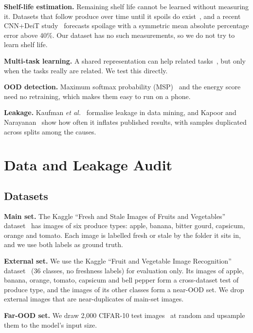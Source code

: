 \documentclass[conference]{IEEEtran}
\begin{document}
\textbf{Shelf-life estimation.} Remaining shelf life cannot be learned without
measuring it. Datasets that follow produce over time until it spoils do
exist~\cite{fruqdb2022}, and a recent CNN+DeiT study~\cite{shelflife2026arxiv}
forecasts spoilage with a symmetric mean absolute percentage error above 40\%.
Our dataset has no such measurements, so we do not try to learn shelf life.

\textbf{Multi-task learning.} A shared representation can help related
tasks~\cite{caruana1997multitask,ruder2017overview}, but only when the tasks
really are related. We test this directly.

\textbf{OOD detection.} Maximum softmax probability (MSP)~\cite{hendrycks2017baseline}
and the energy score~\cite{liu2020energy} need no retraining, which makes them
easy to run on a phone.

\textbf{Leakage.} Kaufman \emph{et al.}~\cite{kaufman2012leakage} formalise
leakage in data mining, and Kapoor and Narayanan~\cite{kapoor2023leakage} show
how often it inflates published results, with samples duplicated across splits
among the causes.

\section{Data and Leakage Audit}
\subsection{Datasets}
\textbf{Main set.} The Kaggle ``Fresh and Stale Images of Fruits and
Vegetables'' dataset~\cite{kaggle_fresh_stale} has \NImages{} images of six
produce types: apple, banana, bitter gourd, capsicum, orange and tomato. Each
image is labelled fresh or stale by the folder it sits in, and we use both
labels as ground truth.

\textbf{External set.} We use the Kaggle ``Fruit and Vegetable Image
Recognition'' dataset~\cite{kaggle_fruit_veg_recognition} (36 classes, no
freshness labels) for evaluation only. Its \NCross{} images of apple, banana,
orange, tomato, capsicum and bell pepper form a cross-dataset test of produce
type, and the \NNearOOD{} images of its other classes form a near-OOD set. We
drop \NExtDropped{} external images that are near-duplicates of main-set images.

\textbf{Far-OOD set.} We draw 2,000 CIFAR-10 test images~\cite{krizhevsky2009cifar}
at random and upsample them to the model's input size.
\end{document}
